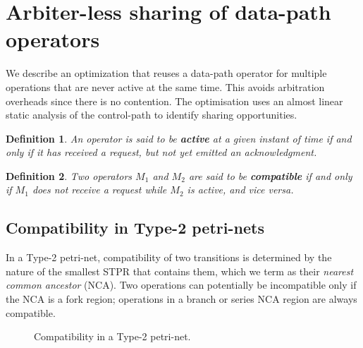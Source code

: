 \documentclass[conference]{IEEEtran}
\newtheorem{definition}{Definition}[section]
\begin{document}
\section{Arbiter-less sharing of data-path operators}

We describe an optimization that reuses a data-path operator for
multiple operations that are never active at the same time. This
avoids arbitration overheads since there is no contention. The
optimisation uses an almost linear static analysis of the control-path
to identify sharing opportunities.

\begin{definition} An operator is said to be {\bf active} at a given
instant of time if and only if it has received a request, but not
yet emitted an acknowledgment.
\end{definition}

\begin{definition} Two operators $M_1$ and $M_2$ are said to be {\bf
compatible} if and only if $M_1$ does not receive a request while
$M_2$ is active, and {\it vice versa}.
\end{definition}

\subsection{Compatibility in Type-2 petri-nets}

In a Type-2 petri-net, compatibility of two transitions is determined
by the nature of the smallest STPR that contains them, which we term
as their {\em nearest common ancestor} (NCA). Two operations can
potentially be incompatible only if the NCA is a fork region;
operations in a branch or series NCA region are always compatible.

\begin{figure}[!t]
  \centering
  \caption{Compatibility in a Type-2 petri-net.}
  \label{figure:compatibility-fork}
\end{figure}
\end{document}
